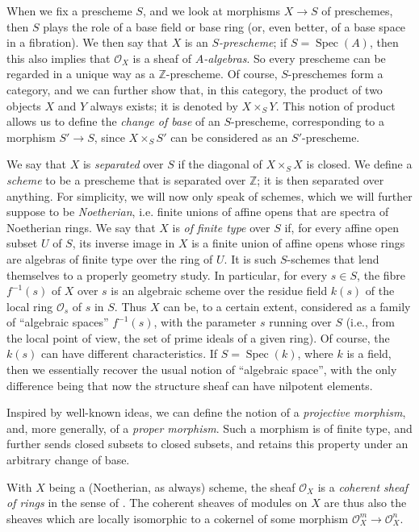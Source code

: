 \documentclass{article}
\newcommand{\scr}[1]{{\mathscr{#1}}}
\DeclareMathOperator{\Spec}{Spec}
\newcommand{\oldpage}[1]{\marginpar{\footnotesize$\Big\vert$ \textit{p.~#1}}}
\begin{document}
When we fix a prescheme $S$, and we look at morphisms $X\to S$ of preschemes, then $S$ plays the role of a base field or base ring (or, even better, of a base space in a fibration).
We then say that $X$ is an \emph{$S$-prescheme};
if $S=\Spec(A)$, then this also implies that $\scr{O}_X$ is a sheaf of \emph{$A$-algebras}.
So every prescheme can be regarded in a unique way as a $\mathbb{Z}$-prescheme.
Of course, $S$-preschemes form a category, and we can further show that, in this category, the product of two objects $X$ and $Y$ always exists;
it is denoted by $X\times_S Y$.
This notion of product allows us to define the \emph{change of base} of an $S$-prescheme, corresponding to a morphism $S'\to S$, since $X\times_S S'$ can be considered as an $S'$-prescheme.

We say that $X$ is \emph{separated} over $S$ if the diagonal of $X\times_S X$ is closed.
We define a \emph{scheme} to be a prescheme that is separated over $\mathbb{Z}$;
it is then separated over anything.
For simplicity, we will now only speak of schemes, which we will further suppose to be \emph{Noetherian}, i.e. finite unions of affine opens that are spectra of Noetherian rings.
We say that $X$ is \emph{of finite type} over $S$ if, for every affine open subset $U$ of $S$, its inverse image in $X$ is a finite union of affine opens whose rings are algebras of finite type over the ring of $U$.
It is such $S$-schemes that lend themselves to a properly geometry study.
In particular, for every $s\in S$, the fibre $f^{-1}(s)$ of $X$ over $s$ is an algebraic scheme over the residue field $k(s)$ of the local ring $\scr{O}_s$ of $s$ in $S$.
Thus $X$ can be, to a certain extent, considered as a family of ``algebraic spaces'' $f^{-1}(s)$, with the parameter $s$ running over $S$ (i.e., from the local point of view, the set of prime ideals of a given ring).
Of course, the $k(s)$ can have different characteristics.
If $S=\Spec(k)$, where $k$ is a field, then we essentially recover the usual notion of ``algebraic space'', with the only difference being that now the structure sheaf can have nilpotent elements.

\oldpage{182-03}
Inspired by well-known ideas, we can define the notion of a \emph{projective morphism}, and, more generally, of a \emph{proper morphism}.
Such a morphism is of finite type, and further sends closed subsets to closed subsets, and retains this property under an arbitrary change of base.

With $X$ being a (Noetherian, as always) scheme, the sheaf $\scr{O}_X$ is a \emph{coherent sheaf of rings} in the sense of \cite{2}.
The coherent sheaves of modules on $X$ are thus also the sheaves which are locally isomorphic to a cokernel of some morphism $\scr{O}_X^m\to\scr{O}_X^n$.
\end{document}
